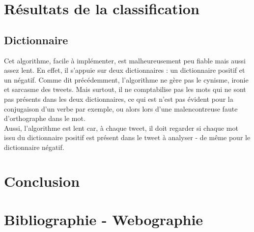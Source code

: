 \documentclass[pdftex,12pt,a4paper]{report}
\begin{document}
\begin{spacing}{1.2}
\chapter{Résultats de la classification}

\section{Dictionnaire}

Cet algorithme, facile à implémenter, est malheureusement peu fiable mais aussi assez lent. En effet, il s'appuie sur deux dictionnaires : un dictionnaire positif et un négatif. Comme dit précédemment, l'algorithme ne gère pas le cynisme, ironie et sarcasme des tweets. Mais surtout, il ne comptabilise pas les mots qui ne sont pas présents dans les deux dictionnaires, ce qui est n'est pas évident pour la conjugaison d'un verbe par exemple, ou alors lors d'une malencontreuse faute d'orthographe dans le mot.
\\
Aussi, l'algorithme est lent car, à chaque tweet, il doit regarder si chaque mot issu du dictionnaire positif est présent dans le tweet à analyser - de même pour le dictionnaire négatif.

\chapter{Conclusion}

\chapter*{Bibliographie - Webographie}

\end{spacing}
\end{document}
